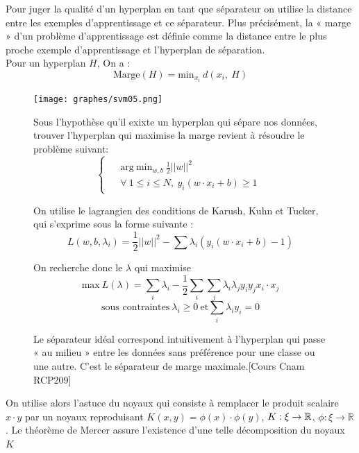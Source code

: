 \documentclass[a4paper,12pt,titlepage]{report}
\begin{document}
Pour juger la qualité d’un hyperplan en tant que séparateur on utilise la distance entre les exemples d’apprentissage et ce séparateur. Plus précisément, la « marge » d’un problème d’apprentissage est définie comme la distance entre le plus proche exemple d’apprentissage et l’hyperplan de séparation. \\
Pour un hyperplan $H$, On a :
\[
\text{Marge}(H) = \text{min}_{x_{i}}\ d(x_i,\ H)
\]
\begin{figure}[!h]
	\begin{center}
	\centering	
		\texttt{[image: graphes/svm05.png]}
		\caption{Le séparateur idéal correspond intuitivement à l’hyperplan qui passe « au milieu » entre les données sans préférence pour une classe ou une autre. C’est le séparateur de marge maximale.[Cours Cnam RCP209]}
	\end{center}

Sous l'hypothèse qu'il exixte un hyperplan qui sépare nos données, trouver l'hyperplan qui maximise la marge revient à résoudre le problème suivant:
\[
	\left\{
	\begin{array}{ccc}		
	\begin{aligned}
		&\text{arg}\ \text{min}_{w,b}\ \frac{1}{2}||w||^{2} \\
		&\forall \ 1 \leqslant i \leqslant N,\ y_i (w \cdot x_i + b)\geqslant 1
	\end{aligned}
\end{array}
	\right.
\]

On utilise le lagrangien des conditions de Karush, Kuhn et Tucker, qui s'exprime sous la forme suivante :
\[
L(w,b,\lambda_{i}) = \frac{1}{2}||w||^{2} - \sum{\lambda_{i}( y_i (w \cdot x_i + b)-1)}
\]

On recherche donc le $\lambda$ qui maximise
\[
\text{max}\ L(\lambda) = \sum_{i}{\lambda_{i}} - \frac{1}{2} \sum_{i}{\sum_{j}{\lambda_{i} \lambda_{j} y_i y_j x_i \cdot x_j}} 
\]
\[
\text{sous contraintes}\ \lambda_i \geqslant 0 \  \text{et} \sum_{i}\lambda_i y_i = 0 
\]
\end{figure}

On utilise alors l'astuce du noyaux qui consiste à remplacer le produit scalaire $x \cdot y$
par un noyaux reproduisant $K(x,y) = \phi(x) \cdot \phi(y)$, $K :\xi \time \xi \rightarrow \mathbb{R}$, $\phi :\xi \rightarrow \mathbb{R}$  . Le théorème de Mercer assure l'existence d'une telle décomposition du noyaux $K$
\end{document}
